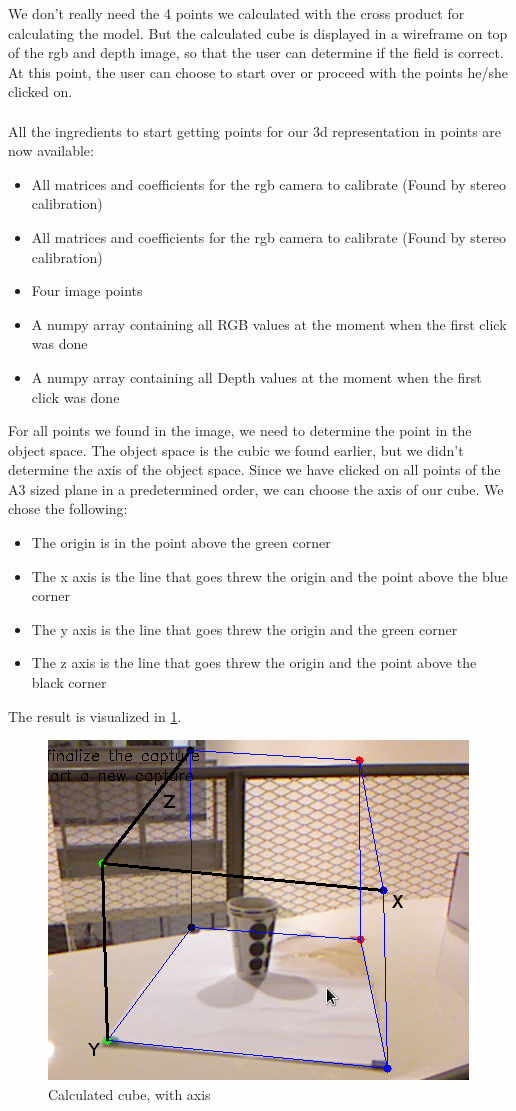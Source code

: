 We don't really need the 4 points we calculated with the cross product for calculating the model. But the calculated cube is displayed in a wireframe on top of the rgb and depth image, so that the user can determine if the field is correct. At this point, the user can choose to start over or proceed with the points he/she clicked on. \\
\\
All the ingredients to start getting points for our 3d representation in points are now available:\\
\begin{itemize}
\item All matrices and coefficients for the rgb camera to calibrate (Found by stereo calibration)
\item All matrices and coefficients for the rgb camera to calibrate (Found by stereo calibration)
\item Four image points
\item A numpy array containing all RGB values at the moment when the first click was done
\item A numpy array containing all Depth values at the moment when the first click was done
\end{itemize}
For all points we found in the image, we need to determine the point in the object space. The object space is the cubic we found earlier, but we didn't determine the axis of the object space. Since we have clicked on all points of the A3 sized plane in a predetermined order, we can choose the axis of our cube. We chose the following: 
\begin{itemize}
\item The origin is in the point above the green corner
\item The x axis is the line that goes threw the origin and the point above the blue corner
\item The y axis is the line that goes threw the origin and the green corner
\item The z axis is the line that goes threw the origin and the point above the black corner
\end{itemize}
The result is visualized in \ref{fig:axis}. 
\begin{figure}[H]
\centering
\includegraphics[scale=0.5]{images/axis.png}
\caption{Calculated cube, with axis}
\label{fig:axis}
\end{figure}




